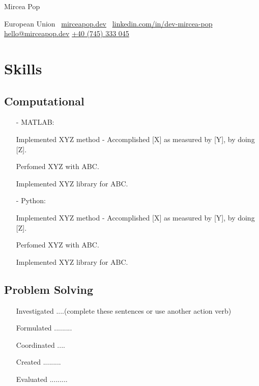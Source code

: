 \documentclass[11pt]{article}
\begin{document}
    
    \begin{center}      
        {\fontsize{28}{28}\selectfont Mircea Pop} \\ \bigskip
    
        {\color{icnclr}\faMapMarker} European Union \quad 
        \mbox{{\color{icnclr}\faGlobe} \href{https://mirceapop.dev}{mirceapop.dev}} \quad 
        \mbox{{\color{icnclr}\faLinkedinIn} \href{https://www.linkedin.com/in/dev-mircea-pop/}{linkedin.com/in/dev-mircea-pop}} \newline
        {\color{icnclr}\faEnvelope[regular]} \href{mailto:hello@mirceapop.dev}{hello@mirceapop.dev} \quad
        {\color{icnclr}} \href{tel:+40745333045}{+40 (745) 333 045} \quad
    \end{center}

    \section{Skills}
    \subsection{Computational}
    \begin{itemize}
        \item[-] \textcolor{Sepia}{MATLAB}:
        \item[\checkmark] Implemented XYZ method - Accomplished [X] as measured by [Y], by doing [Z].  
        \item[\checkmark] Perfomed XYZ with ABC. 
        \item[\checkmark] Implemented XYZ library for ABC. 
        \item[-] \textcolor{Sepia}{Python}: 
        \item[\checkmark] Implemented XYZ method - Accomplished [X] as measured by [Y], by doing [Z].  
        \item[\checkmark] Perfomed XYZ with ABC. 
        \item[\checkmark] Implemented XYZ library for ABC.
    \end{itemize}
    \subsection{Problem Solving}
    \begin{itemize}
        \item[\checkmark] Investigated ....(complete these sentences or use another action verb)
        \item[\checkmark] Formulated .........
        \item[\checkmark] Coordinated ....
        \item[\checkmark] Created .........
        \item[\checkmark] Evaluated .........
    \end{itemize}
\end{document}

